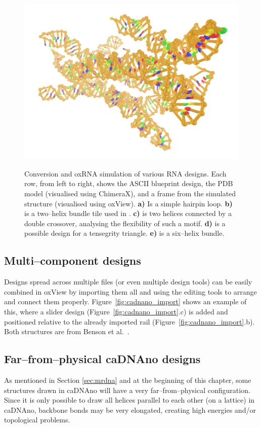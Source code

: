 \begin{figure}[ht]
\begin{center}
{  \centering\includegraphics[align=c,width=\textwidth/3]{figures/oxrna_sims/6HB-5KL_last_conf.png}
}
\end{center}
\caption{Conversion and oxRNA simulation of various RNA designs. Each row, from left to right, shows the ASCII blueprint design, the PDB model (visualised using ChimeraX), and a frame from the simulated structure (visualised using oxView).  \textbf{a)} Is a simple hairpin loop.  \textbf{b)} is a two--helix bundle tile used in \cite{geary2014single}.  \textbf{c)} is two helices connected by a double crossover, analysing the flexibility of such a motif.  \textbf{d)} is a possible design for a tensegrity triangle. \textbf{e)} is a six--helix bundle.}
\label{fig:oxRNA_sims}\end{figure}

\subsection{Multi--component designs}
Designs spread across multiple files (or even multiple design tools) can be easily combined in oxView by importing them all and using the editing tools to arrange and connect them properly. Figure~\ref{fig:cadnano_import} shows an example of this, where a slider design (Figure~\ref{fig:cadnano_import}.c) is added and positioned relative to the already imported rail (Figure~\ref{fig:cadnano_import}.b). Both structures are from Benson et al.\ \cite{benson2021strategies}.

\subsection{Far--from--physical caDNAno designs}
As mentioned in Section \ref{sec:mrdna} and at the beginning of this chapter, some structures drawn in caDNAno will have a very far--from--physical configuration. Since it is only possible to draw all helices parallel to each other (on a lattice) in caDNAno, backbone bonds may be very elongated, creating high energies and/or topological problems.

